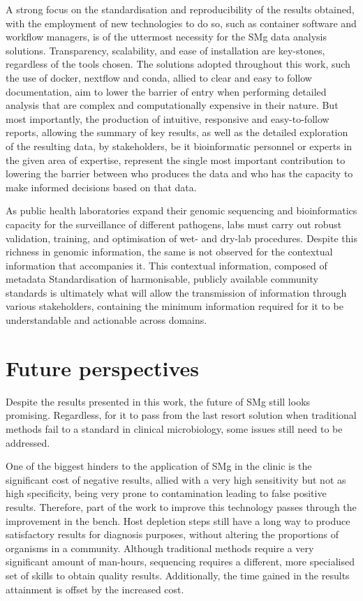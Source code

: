 A strong focus on  the standardisation and reproducibility of the results obtained, with the employment of new technologies to do so, such as container software and workflow managers, is of the uttermost necessity for the \ac{SMg} data analysis solutions. Transparency, scalability, and ease of installation are key-stones, regardless of the tools chosen. The solutions adopted throughout this work, such the use of docker, nextflow and conda, allied to clear and easy to follow documentation, aim to lower the barrier of entry when performing detailed analysis that are complex and computationally expensive in their nature. But most importantly, the production of intuitive, responsive and easy-to-follow reports, allowing the summary of key results, as well as the detailed exploration of the resulting data, by stakeholders, be it bioinformatic personnel or experts in the given area of expertise, represent the single most important contribution to lowering the barrier between who produces the data and who has the capacity to make informed decisions based on that data.   

As public health laboratories expand their genomic sequencing and bioinformatics capacity for the surveillance of different pathogens, labs must carry out robust validation, training, and optimisation of wet- and dry-lab procedures. Despite this richness in genomic information, the same is not observed for the contextual information that accompanies it. This contextual information, composed of metadata  Standardisation of harmonisable, publicly available community standards is ultimately what will allow the transmission of information through various stakeholders, containing the minimum information required for it to be understandable and actionable across domains. 

\section{Future perspectives}

Despite the results presented in this work, the future of \ac{SMg} still looks promising. Regardless, for it to pass from the last resort solution when traditional methods fail to a standard in clinical microbiology, some issues still need to be addressed. 

One of the biggest hinders to the application of \ac{SMg} in the clinic is the significant cost of negative results, allied with a very high sensitivity but not as high specificity, being very prone to contamination leading to false positive results. Therefore, part of the work to improve this technology passes through the improvement in the bench. Host depletion steps still have a long way to produce satisfactory results for diagnosis purposes, without altering the proportions of organisms in a community. Although traditional methods require a very significant amount of man-hours, sequencing requires a different, more specialised set of skills to obtain quality results. Additionally, the time gained in the results attainment is offset by the increased cost. 

